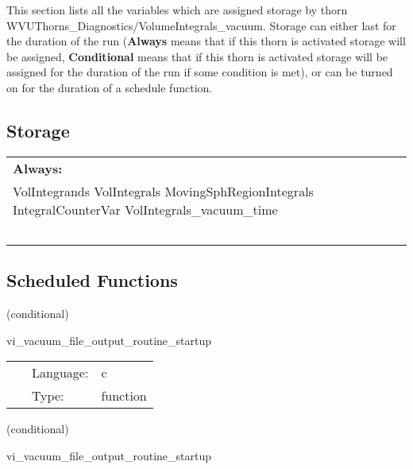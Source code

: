 \noindent This section lists all the variables which are assigned storage by thorn WVUThorns\_Diagnostics/VolumeIntegrals\_vacuum.  Storage can either last for the duration of the run ({\bf Always} means that if this thorn is activated storage will be assigned, {\bf Conditional} means that if this thorn is activated storage will be assigned for the duration of the run if some condition is met), or can be turned on for the duration of a schedule function.


\subsection*{Storage}

\hspace{5mm}

 \begin{tabular*}{160mm}{ll} 

{\bf Always:}&  ~ \\ 
 VolIntegrands VolIntegrals MovingSphRegionIntegrals IntegralCounterVar VolIntegrals\_vacuum\_time & ~\\ 
~ & ~\\ 
\end{tabular*} 


\subsection*{Scheduled Functions}
\vspace{5mm}

   (conditional) 

\hspace{5mm} vi\_vacuum\_file\_output\_routine\_startup 

\hspace{5mm}{\it create directory for file output. } 


\hspace{5mm}

 \begin{tabular*}{160mm}{cll} 
~ & Language:  & c \\ 
~ & Type:  & function \\ 
\end{tabular*} 


\vspace{5mm}

   (conditional) 

\hspace{5mm} vi\_vacuum\_file\_output\_routine\_startup 

